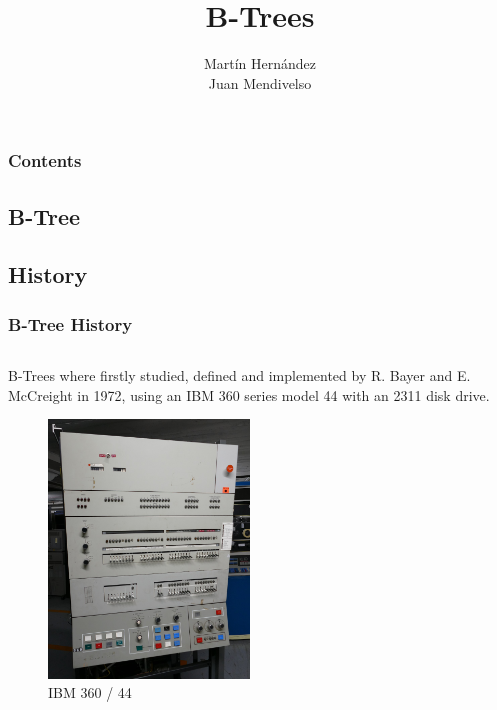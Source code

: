 \documentclass{beamer}
\title{B-Trees}
\author{%
    Martín Hernández\\%
    Juan Mendivelso%
}
\date{} %
\begin{document}


\begin{frame}
    \titlepage
\end{frame}

\begin{frame}
    \frametitle{Contents}
    \tableofcontents
\end{frame}
\begin{frame}
    \section{B-Tree}
    \subsection{History}
    \frametitle{B-Tree History}
    \begin{columns}
        \begin{column}{0.5\textwidth}
            \begin{block}{}
                B-Trees where firstly studied, defined and implemented by R. Bayer and E. McCreight in 1972, using an IBM 360 series model 44 with an 2311 disk drive.
                \begin{figure}
                    \centering
                    \includegraphics[width=0.5\textwidth,height=\textheight,keepaspectratio]{resources/made/ibm360_44.png}
                    \caption[]{IBM 360 / 44}
                \end{figure}
            \end{block}
        \end{column}
        \begin{column}{0.5\textwidth}

\end{column}
\end{columns}
\end{frame}
\end{document}
